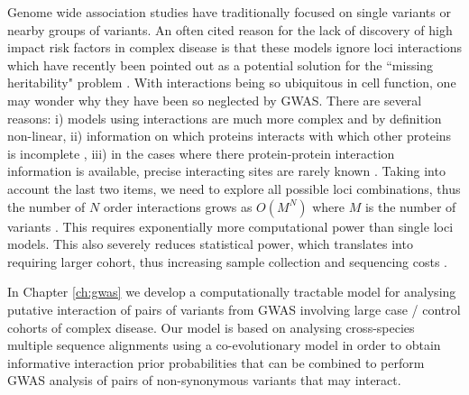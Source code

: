 Genome wide association studies have traditionally focused on single variants or nearby groups of variants. An often cited reason for the lack of discovery of high impact risk factors in complex disease is that these models ignore loci interactions \cite{cordell2009detecting} which have recently been pointed out as a potential solution for the ``missing heritability" problem \cite{zuk2012mystery, zuk2014searching}. With interactions being so ubiquitous in cell function, one may wonder why they have been so neglected by GWAS. There are several reasons: i) models using interactions are much more complex \cite{gao2010classification} and by definition non-linear, ii) information on which proteins interacts with which other proteins is incomplete \cite{venkatesan2009empirical}, iii) in the cases where there protein-protein interaction information is available, precise interacting sites are rarely known \cite{venkatesan2009empirical}. Taking into account the last two items, we need to explore all possible loci combinations, thus the number of $N$ order interactions grows as $O(M^N)$ where $M$ is the number of variants \cite{de2013emerging}. This requires exponentially more computational power than single loci models. This also severely reduces statistical power, which translates into requiring larger cohort, thus increasing sample collection and sequencing costs \cite{de2013emerging}.

In Chapter \ref{ch:gwas} we develop a computationally tractable model for analysing putative interaction of pairs of variants from GWAS involving large case / control cohorts of complex disease. Our model is based on analysing cross-species multiple sequence alignments using a co-evolutionary model in order to obtain informative interaction prior probabilities that can be combined to perform GWAS analysis of pairs of non-synonymous variants that may interact.

